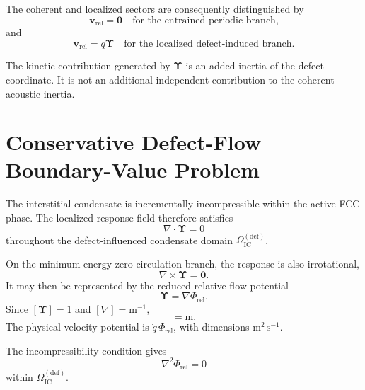 The coherent and localized sectors are consequently distinguished by
\begin{equation}
    \mathbf{v}_{\mathrm{rel}} = \mathbf{0} \quad \text{for the entrained periodic branch,}
\end{equation}
and
\begin{equation}
    \mathbf{v}_{\mathrm{rel}} = \dot{q}\boldsymbol{\Upsilon} \quad \text{for the localized defect-induced branch.}
\end{equation}

The kinetic contribution generated by $\boldsymbol{\Upsilon}$ is an added inertia of the defect coordinate. It is not an additional independent contribution to the coherent acoustic inertia.

\section[Defect-Flow Boundary-Value Problem]{Conservative Defect-Flow Boundary-Value Problem}
\label{sec:AP_defect_boundary_value_problem}

The interstitial condensate is incrementally incompressible within the active FCC phase. The localized response field therefore satisfies
\begin{equation}
    \nabla\cdot\boldsymbol\Upsilon=0
\end{equation}
throughout the defect-influenced condensate domain \(\Omega_{\mathrm{IC}}^{(\mathrm{def})}\).

On the minimum-energy zero-circulation branch, the response is also irrotational,
\begin{equation}
    \nabla\times\boldsymbol\Upsilon=\mathbf0.
\end{equation}
It may then be represented by the reduced relative-flow potential
\begin{equation}
    \boldsymbol\Upsilon=\nabla\Phi_{\mathrm{rel}}.
\end{equation}
Since \([\boldsymbol\Upsilon]=1\) and \([\nabla]=\mathrm m^{-1}\),
\begin{equation}
    [\Phi_{\mathrm{rel}}]=\mathrm m.
\end{equation}
The physical velocity potential is \(\dot q\,\Phi_{\mathrm{rel}}\), with dimensions \(\mathrm{m^2\,s^{-1}}\).

The incompressibility condition gives
\begin{equation}
    \nabla^2\Phi_{\mathrm{rel}}=0
\end{equation}
within \(\Omega_{\mathrm{IC}}^{(\mathrm{def})}\).

